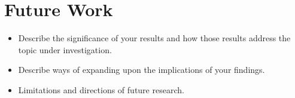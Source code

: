 \section{Future Work}

\begin{itemize}
  \item Describe the significance of your results and how those results address the topic under investigation.
  \item Describe ways of expanding upon the implications of your findings.
  \item Limitations and directions of future research.
\end{itemize}
